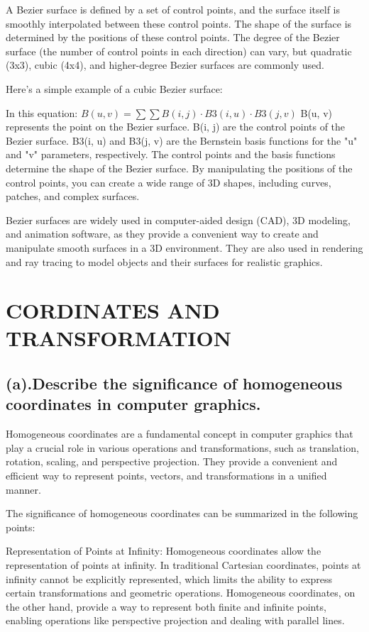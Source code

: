 \documentclass{article}
\begin{document}
\begin{itemize}
A Bezier surface is defined by a set of control points, and the surface itself is smoothly interpolated between these control points. The shape of the surface is determined by the positions of these control points. The degree of the Bezier surface (the number of control points in each direction) can vary, but quadratic (3x3), cubic (4x4), and higher-degree Bezier surfaces are commonly used.

Here's a simple example of a cubic Bezier surface:

In this equation:
$B(u, v) = \sum \sum B(i, j) \cdot B3(i, u) \cdot B3(j, v)$
B(u, v) represents the point on the Bezier surface.
B(i, j) are the control points of the Bezier surface.
B3(i, u) and B3(j, v) are the Bernstein basis functions for the "u" and "v" parameters, respectively.
The control points and the basis functions determine the shape of the Bezier surface. By manipulating the positions of the control points, you can create a wide range of 3D shapes, including curves, patches, and complex surfaces.

Bezier surfaces are widely used in computer-aided design (CAD), 3D modeling, and animation software, as they provide a convenient way to create and manipulate smooth surfaces in a 3D environment. They are also used in rendering and ray tracing to model objects and their surfaces for realistic graphics.
\section{CORDINATES AND TRANSFORMATION}
\subsection{(a).Describe the significance of homogeneous coordinates in computer graphics.}
Homogeneous coordinates are a fundamental concept in computer graphics that play a crucial role in various operations and transformations, such as translation, rotation, scaling, and perspective projection. They provide a convenient and efficient way to represent points, vectors, and transformations in a unified manner.

The significance of homogeneous coordinates can be summarized in the following points:

Representation of Points at Infinity: Homogeneous coordinates allow the representation of points at infinity. In traditional Cartesian coordinates, points at infinity cannot be explicitly represented, which limits the ability to express certain transformations and geometric operations. Homogeneous coordinates, on the other hand, provide a way to represent both finite and infinite points, enabling operations like perspective projection and dealing with parallel lines.


\end{itemize}
\end{document}
